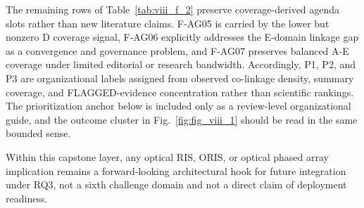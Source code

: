 \documentclass[lettersize,journal]{IEEEtran}
\begin{document}
The remaining rows of Table~\ref{tab:viii_f_2} preserve coverage-derived agenda slots rather than new literature claims. F-AG05 is carried by the lower but nonzero D coverage signal, F-AG06 explicitly addresses the E-domain linkage gap as a convergence and governance problem, and F-AG07 preserves balanced A-E coverage under limited editorial or research bandwidth. Accordingly, P1, P2, and P3 are organizational labels assigned from observed co-linkage density, summary coverage, and FLAGGED-evidence concentration rather than scientific rankings. The prioritization anchor below is included only as a review-level organizational guide, and the outcome cluster in Fig.~\ref{fig:fig_viii_1} should be read in the same bounded sense.

Within this capstone layer, any optical RIS, ORIS, or optical phased array implication remains a forward-looking architectural hook for future integration under RQ3, not a sixth challenge domain and not a direct claim of deployment readiness.
\end{document}
